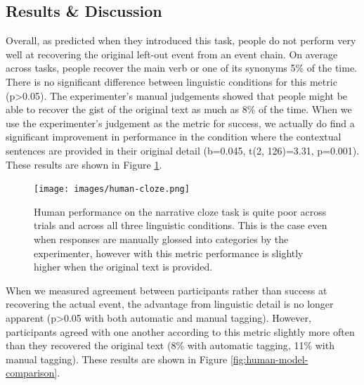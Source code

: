 \documentclass[10pt,a4paper]{article}
\begin{document}
\subsection{Results \& Discussion}

Overall, as  predicted when they introduced this task, people do not perform very well at recovering the original left-out event from an event chain. On average across tasks, people recover the main verb or one of its synonyms 5\% of the time. There is no significant difference between linguistic conditions for this metric (p>0.05). The experimenter's manual judgements showed that people might be able to recover the gist of the original text as much as 8\% of the time. When we use the experimenter's judgement as the metric for success, we actually do find a significant improvement in performance in the condition where the contextual sentences are provided in their original detail (b=0.045, t(2, 126)=3.31, p=0.001). These results are shown in Figure \ref{fig:human-cloze}.

\begin{figure}
 \centering
 \texttt{[image: images/human-cloze.png]}
 \caption{Human performance on the narrative cloze task is quite poor across trials and across all three linguistic conditions. This is the case even when responses are manually glossed into categories by the experimenter, however with this metric performance is slightly higher when the original text is provided.}
 \label{fig:human-cloze}
\end{figure}

When we measured agreement between participants rather than success at recovering the actual event, the advantage from linguistic detail is no longer apparent (p>0.05 with both automatic and manual tagging). However, participants agreed with one another according to this metric slightly more often than they recovered the original text (8\% with automatic tagging, 11\% with manual tagging). These results are shown in Figure \ref{fig:human-model-comparison}.

\end{document}
